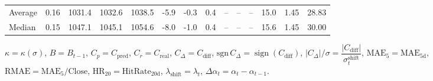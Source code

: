 \begin{threeparttable}
{\begin{tabular}{lrrrrrrrrrrrrr}
Average &     0.16 & 1031.4 & 1032.6 & 1038.5 &       -5.9 &                     -0.3 &                 0.4 &         -- &        -- &             -- &             15.0 &            1.45 &                  28.83 \\
 Median &     0.15 & 1047.1 & 1045.1 & 1054.6 &       -8.0 &                     -1.0 &                 0.4 &         -- &        -- &             -- &             15.6 &            1.45 &                  30.00 \\
\bottomrule
\end{tabular}
}
\begin{tablenotes}\footnotesize
\item $\kappa=\kappa(\sigma)$, $B=B_{t-1}$, $C_p=C_{\text{pred}}$, $C_r=C_{\text{real}}$, $C_\Delta=C_{\text{diff}}$, $\mathrm{sgn}\,C_\Delta=\operatorname{sign}(C_{\text{diff}})$, $|C_\Delta|/\sigma=\dfrac{|C_{\text{diff}}|}{\sigma_t^{\text{shift}}}$, $\mathrm{MAE}_5=\mathrm{MAE}_{5\text{d}}$, $\mathrm{RMAE}= \mathrm{MAE}_5 / \text{Close}$, $\mathrm{HR}_{20}=\mathrm{HitRate}_{20\text{d}}$, 
$\lambda_{\text{shift}}=\lambda_t$, 
$\Delta\alpha_t=\alpha_t-\alpha_{t-1}$.
\end{tablenotes}
\end{threeparttable}
\endgroup

